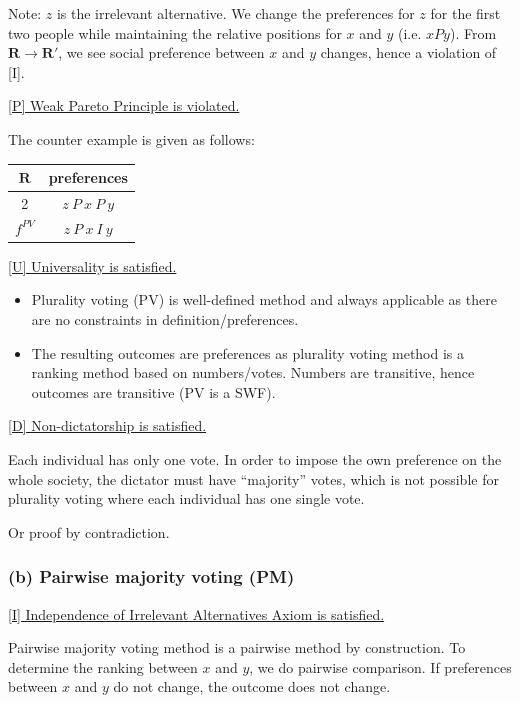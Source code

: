 \documentclass[a4paper]{article}
\begin{document}
Note: $z$ is the irrelevant alternative. We change the preferences for $z$ for the first two people while maintaining the relative positions for $x$ and $y$ (i.e. $xPy$). From $\mathbf{R}\to\mathbf{R'}$, we see social preference between $x$ and $y$ changes, hence a violation of [I].

\underline{[P] Weak Pareto Principle is violated. }

The counter example is given as follows:

\begin{table}[!htbp]
    \centering
    \begin{tabular}{c|c|}
        $\mathbf{R}$ & preferences         \\ 
        \hline
        2  & $z\: P\: x\: P\: y$ \\
        \hline 
        $f^{PV}$ & $z\: P\: x\: I\: y$
    \end{tabular}
\end{table}

\underline{[U] Universality is satisfied. }

\begin{itemize}
    \item Plurality voting (PV) is well-defined method and always applicable as there are no constraints in definition/preferences.
    \item The resulting outcomes are preferences as plurality voting method is a ranking method based on numbers/votes. Numbers are transitive, hence outcomes are transitive (PV is a SWF).
\end{itemize}

\underline{[D] Non-dictatorship is satisfied.} 

Each individual has only one vote. In order to impose the own preference on the whole society, the dictator must have ``majority'' votes, which is not possible for plurality voting where each individual has one single vote.

Or proof by contradiction.

\subsubsection*{(b) Pairwise majority voting (PM)}

\underline{[I] Independence of Irrelevant Alternatives Axiom is satisfied. }

Pairwise majority voting method is a pairwise method by construction. To determine the ranking between $x$ and $y$, we do pairwise comparison. If preferences between $x$ and $y$ do not change, the outcome does not change.
\end{document}
